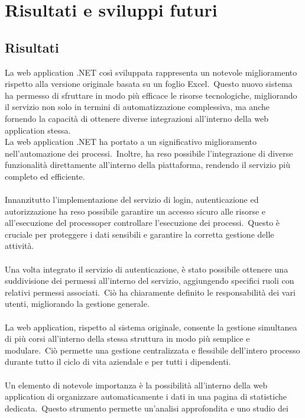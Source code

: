 \chapter{Risultati e sviluppi futuri}\label{chapter:Risultati_e_sviluppi_futuri}
%
\section{Risultati}\label{sec:cap_sec_subsec}
%
La web application .NET così sviluppata rappresenta un notevole miglioramento rispetto alla versione 
originale basata su un foglio Excel.\ Questo nuovo sistema ha permesso di sfruttare in modo più efficace 
le risorse tecnologiche, migliorando il servizio non solo in termini di automatizzazione complessiva, 
ma anche fornendo la capacità di ottenere diverse integrazioni all'interno della web application stessa.
\\
La web application .NET ha portato a un significativo miglioramento 
nell'automazione dei processi.\ Inoltre, ha reso possibile l'integrazione di diverse funzionalità direttamente 
all'interno della piattaforma, rendendo il servizio più completo ed efficiente.
\\ \\
Innanzitutto l'implementazione del servizio di login, autenticazione ed autorizzazione ha reso possibile 
garantire un accesso sicuro alle risorse e all'esecuzione del processoper controllare l'esecuzione dei processi.\ 
Questo è cruciale per proteggere i dati sensibili e garantire la corretta gestione delle attività.
\\ \\
Una volta integrato il servizio di autenticazione, è stato possibile ottenere una suddivisione dei permessi 
all'interno del servizio, aggiungendo specifici ruoli con relativi permessi associati.\ Ciò ha chiaramente 
definito le responsabilità dei vari utenti, migliorando la gestione generale.
\\ \\
La web application, rispetto al sistema originale, consente la gestione simultanea di più corsi all'interno 
della stessa struttura in modo più semplice e modulare.\ Ciò permette una gestione centralizzata e flessibile 
dell'intero processo durante tutto il ciclo di vita aziendale e per tutti i dipendenti.
\\ \\
Un elemento di notevole importanza è la possibilità all'interno della web application di organizzare automaticamente 
i dati in una pagina di statistiche dedicata.\ Questo strumento permette un'analisi approfondita e uno studio dei 
